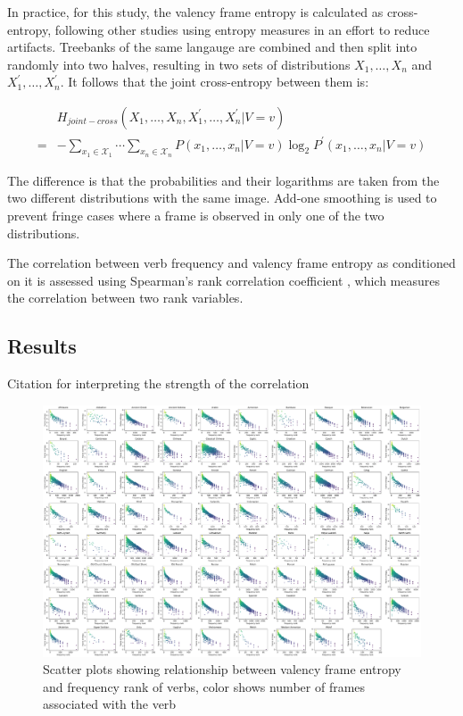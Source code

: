 In practice, for this study, the valency frame entropy is calculated as cross-entropy, following other studies using entropy measures \citep{hahn2021} in an effort to reduce artifacts. Treebanks of the same langauge are combined and then split into randomly into two halves, resulting in two sets of distributions $X_1,\ldots,X_n$ and $X_1^{\prime},\ldots,X_n^{\prime}$. It follows that the joint cross-entropy between them is:

\begin{equation*}
  \begin{split}
   & H_{joint-cross}(X_{1},\ldots,X_{n},X_{1}^{\prime},\ldots,X_{n}^{\prime}|V=v)\\
  =& -\sum\limits_{x_1\in{}\mathcal{X}_1}\cdots\sum\limits_{x_n\in{}\mathcal{X}_n}{P(x_1,\ldots,x_{n}|V=v)\log_{2}P^{\prime}(x_1,\ldots,x_n|V=v)}
  \end{split}
\end{equation*}
  
The difference is that the probabilities and their logarithms are taken from the two different distributions with the same image. Add-one smoothing is used to prevent fringe cases where a frame is observed in only one of the two distributions.

The correlation between verb frequency and valency frame entropy as conditioned on it is assessed using Spearman's rank correlation coefficient \citep{spearman1904}, which measures the correlation between two rank variables. 

\subsection{Results}


Citation for interpreting the strength of the correlation \citep{schober2018}

\begin{figure}
  \centering
  \includegraphics[width=\textwidth]{figures/joint_entropy_freq.pdf}
  \caption{Scatter plots showing relationship between valency frame entropy and frequency rank of verbs, color shows number of frames associated with the verb}
  \label{fig:joint_entropy_freq}
\end{figure}

